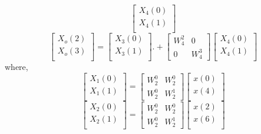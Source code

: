 \documentclass[journal,12pt,twocolumn]{IEEEtran}
\renewcommand\thesection{\arabic{section}}
\begin{document}
\begin{enumerate}[label=\thesection.\arabic*.,ref=\thesection.\theenumi]
\begin{equation}
\begin{bmatrix}
X_{4}(0) \\ 
X_{4}(1) \\ 
\end{bmatrix}
\end{equation}
\begin{equation}
\begin{bmatrix}
X_{o}(2) \\ 
X_{o}(3)\\ 
\end{bmatrix}
=
\begin{bmatrix}
X_{3}(0) \\ 
X_{3}(1)\\ 
\end{bmatrix}.
+
\begin{bmatrix}
W^{2}_{4} & 0\\
0 & W^{3}_{4}
\end{bmatrix}
\begin{bmatrix}
X_{4}(0) \\ 
X_{4}(1) \\ 
\end{bmatrix}
\end{equation}
where,
\begin{equation}
\begin{bmatrix}
X_{1}(0) \\ 
X_{1}(1)\\ 
\end{bmatrix}
= 
\begin{bmatrix}
W^{0}_{2}&W^{0}_{2}\\
W^{0}_{2}&W^{1}_{2}
\end{bmatrix}
\begin{bmatrix}
x(0) \\ 
x(4) \\ 
\end{bmatrix}
\end{equation}
\begin{equation}
\begin{bmatrix}
X_{2}(0) \\ 
X_{2}(1)\\ 
\end{bmatrix}
= 
\begin{bmatrix}
W^{0}_{2}&W^{0}_{2}\\
W^{0}_{2}&W^{1}_{2}
\end{bmatrix}
\begin{bmatrix}
x(2) \\ 
x(6) \\ 
\end{bmatrix}
\end{equation}

\end{enumerate}
\end{document}
